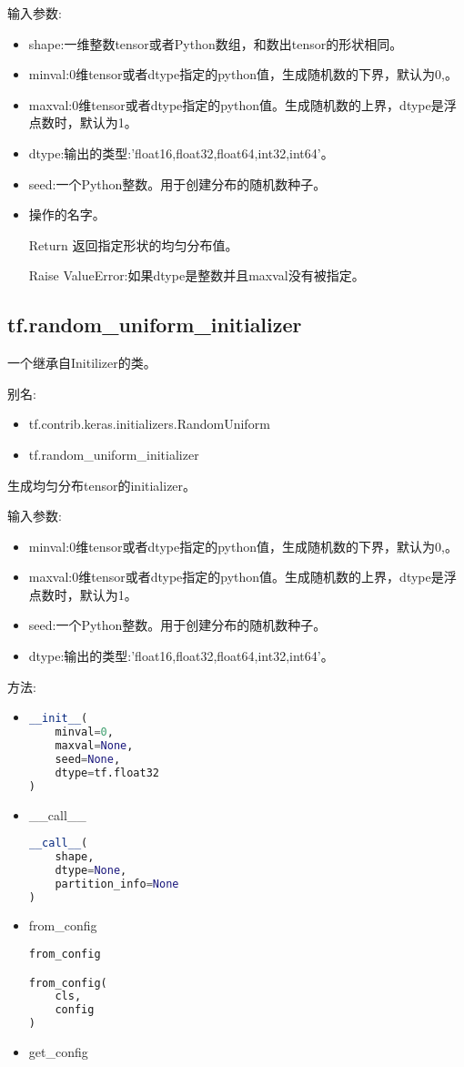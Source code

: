 输入参数:
\begin{itemize}
\item shape:一维整数tensor或者Python数组，和数出tensor的形状相同。
\item minval:0维tensor或者dtype指定的python值，生成随机数的下界，默认为0,。
\item maxval:0维tensor或者dtype指定的python值。生成随机数的上界，dtype是浮点数时，默认为1。
\item dtype:输出的类型:'float16,float32,float64,int32,int64'。
\item seed:一个Python整数。用于创建分布的随机数种子。
\item 操作的名字。
\item [Return] 返回指定形状的均匀分布值。
\item [Raise] ValueError:如果dtype是整数并且maxval没有被指定。
\end{itemize}
\subsection{\textbf{tf.random\_uniform\_initializer}}
一个继承自Initilizer的类。

别名:
\begin{itemize}
\item tf.contrib.keras.initializers.RandomUniform
\item tf.random\_uniform\_initializer
\end{itemize}
生成均匀分布tensor的initializer。

输入参数:
\begin{itemize}
\item minval:0维tensor或者dtype指定的python值，生成随机数的下界，默认为0,。
\item maxval:0维tensor或者dtype指定的python值。生成随机数的上界，dtype是浮点数时，默认为1。
\item seed:一个Python整数。用于创建分布的随机数种子。
\item dtype:输出的类型:'float16,float32,float64,int32,int64'。
\end{itemize}
方法:
\begin{itemize}
\item \begin{lstlisting}[language=Python]__init__(
    minval=0,
    maxval=None,
    seed=None,
    dtype=tf.float32
)\end{lstlisting}
\item \_\_call\_\_
\begin{lstlisting}[language=Python]
__call__(
    shape,
    dtype=None,
    partition_info=None
)
\end{lstlisting}
\item from\_config
\begin{lstlisting}[language=Python]
from_config

from_config(
    cls,
    config
)
\end{lstlisting}
\item get\_config
\end{itemize}
